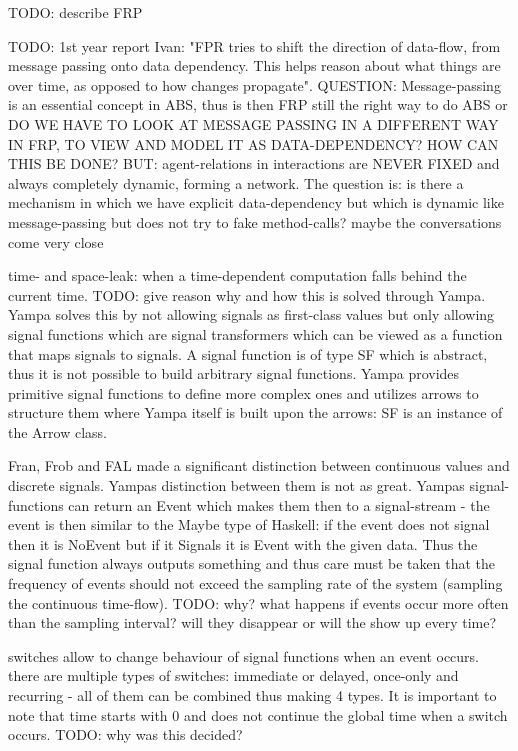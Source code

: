 TODO: describe FRP

TODO: 1st year report Ivan: "FPR tries to shift the direction of data-flow, from message passing onto data dependency. This helps reason about what things are over time, as opposed to how changes propagate". QUESTION: Message-passing is an essential concept in ABS, thus is then FRP still the right way to do ABS or DO WE HAVE TO LOOK AT MESSAGE PASSING IN A DIFFERENT WAY IN FRP, TO VIEW AND MODEL IT AS DATA-DEPENDENCY? HOW CAN THIS BE DONE?
BUT: agent-relations in interactions are NEVER FIXED and always completely dynamic, forming a network. The question is: is there a mechanism in which we have explicit data-dependency but which is dynamic like message-passing but does not try to fake method-calls? maybe the conversations come very close

time- and space-leak: when a time-dependent computation falls behind the current time. TODO: give reason why and how this is solved through Yampa.
Yampa solves this by not allowing signals as first-class values but only allowing signal functions which are signal transformers which can be viewed as a function that maps signals to signals. A signal function is of type SF which is abstract, thus it is not possible to build arbitrary signal functions. Yampa provides primitive signal functions to define more complex ones and utilizes arrows \cite{hughes_programming_2005} to structure them where Yampa itself is built upon the arrows: SF is an instance of the Arrow class. 

Fran, Frob and FAL made a significant distinction between continuous values and discrete signals. Yampas distinction between them is not as great. Yampas signal-functions can return an Event which makes them then to a signal-stream - the event is then similar to the Maybe type of Haskell: if the event does not signal then it is NoEvent but if it Signals it is Event with the given data. Thus the signal function always outputs something and thus care must be taken that the frequency of events should not exceed the sampling rate of the system (sampling the continuous time-flow). TODO: why? what happens if events occur more often than the sampling interval? will they disappear or will the show up every time?

switches allow to change behaviour of signal functions when an event occurs. there are multiple types of switches: immediate or delayed, once-only and recurring - all of them can be combined thus making 4 types. It is important to note that time starts with 0 and does not continue the global time when a switch occurs. TODO: why was this decided?

